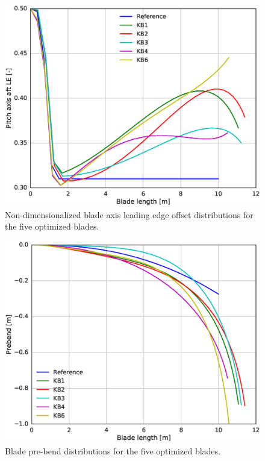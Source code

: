 \begin{figure}[!ht]
\begin{center}
	\includegraphics[width=.85\linewidth]{figures/KBcomp_ple.eps}
\end{center}
\caption{Non-dimensionalized blade axis leading edge offset distributions for the five optimized blades.}
\label{fig:p_le}
\end{figure}

\begin{figure}[!ht]
\begin{center}
	\includegraphics[width=.85\linewidth]{figures/KBcomp_prebend.eps}
\end{center}
\caption{Blade pre-bend distributions for the five optimized blades.}
\label{fig:prebend}
\end{figure}

